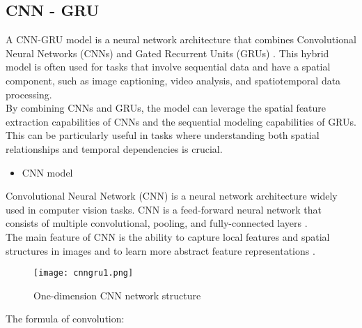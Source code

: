 \documentclass{ieeeojies}
\begin{document}
\subsection{CNN - GRU}
\begin{flushleft}
    
\hspace{0.4cm}A CNN-GRU model is a neural network architecture that combines Convolutional Neural Networks (CNNs) and Gated Recurrent Units (GRUs) \cite{cnngru1&lstm1}. This hybrid model is often used for tasks that involve sequential data and have a spatial component, such as image captioning, video analysis, and spatiotemporal data processing.\\
\hspace{0.4cm}By combining CNNs and GRUs, the model can leverage the spatial feature extraction capabilities of CNNs and the sequential modeling capabilities of GRUs. This can be particularly useful in tasks where understanding both spatial relationships and temporal dependencies is crucial.\\
\begin{itemize}
    \item CNN model\\
\end{itemize}
\hspace{0.4cm}Convolutional Neural Network (CNN) is a neural network architecture widely used in computer vision tasks. CNN is a feed-forward neural network that consists of multiple convolutional, pooling, and fully-connected layers \cite{cnngru1&lstm1}.\\
\hspace{0.4cm}The main feature of CNN is the ability to capture local features and spatial structures in images and to learn more abstract feature representations \cite{cnngru1&lstm1}.
\begin{figure}[H]
    \centering
    \texttt{[image: cnngru1.png]}
    \caption{\centering One-dimension CNN network structure}
    \label{fig:enter-label}
\end{figure}
The formula of convolution:\\
\end{flushleft}
\end{document}
